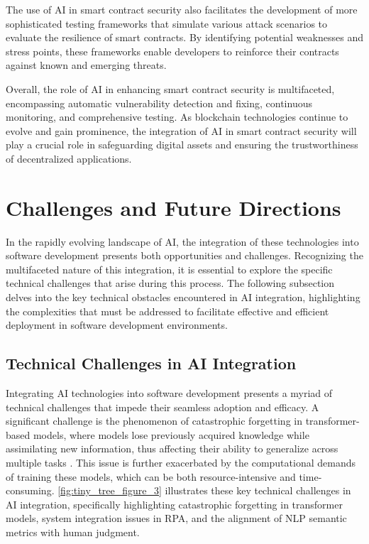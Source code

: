 The use of AI in smart contract security also facilitates the development of more sophisticated testing frameworks that simulate various attack scenarios to evaluate the resilience of smart contracts. By identifying potential weaknesses and stress points, these frameworks enable developers to reinforce their contracts against known and emerging threats.



Overall, the role of AI in enhancing smart contract security is multifaceted, encompassing automatic vulnerability detection and fixing, continuous monitoring, and comprehensive testing. As blockchain technologies continue to evolve and gain prominence, the integration of AI in smart contract security will play a crucial role in safeguarding digital assets and ensuring the trustworthiness of decentralized applications.











\section{Challenges and Future Directions} \label{sec:Challenges and Future Directions}

In the rapidly evolving landscape of AI, the integration of these technologies into software development presents both opportunities and challenges. Recognizing the multifaceted nature of this integration, it is essential to explore the specific technical challenges that arise during this process. The following subsection delves into the key technical obstacles encountered in AI integration, highlighting the complexities that must be addressed to facilitate effective and efficient deployment in software development environments.






\subsection{Technical Challenges in AI Integration} \label{subsec:Technical Challenges in AI Integration}

Integrating AI technologies into software development presents a myriad of technical challenges that impede their seamless adoption and efficacy. A significant challenge is the phenomenon of catastrophic forgetting in transformer-based models, where models lose previously acquired knowledge while assimilating new information, thus affecting their ability to generalize across multiple tasks \cite{chitale2023taskarithmeticloracontinual}. This issue is further exacerbated by the computational demands of training these models, which can be both resource-intensive and time-consuming. \autoref{fig:tiny_tree_figure_3} illustrates these key technical challenges in AI integration, specifically highlighting catastrophic forgetting in transformer models, system integration issues in RPA, and the alignment of NLP semantic metrics with human judgment.

